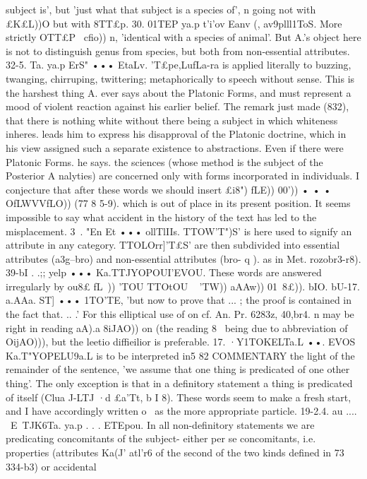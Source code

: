 {{{{{{{{{{{{{{{{{{{{{{{{{{{{{{subject is', but 'just what that subject is a species of', n going
not with £K£L))O but with 8TT£p.
30. 01TEP ya.p t'i'ov Eanv (, av9plll1ToS. More strictly OTT£P ~cfio))
n, 'identical with a species of animal'. But A.'s object here is not
to distinguish genus from species, but both from non-essential
attributes.
32-5. Ta. ya.p ErS" ••• EtaLv. 'T£pe,LufLa-ra is applied literally to
buzzing, twanging, chirruping, twittering; metaphorically to
speech without sense. This is the harshest thing A. ever says
about the Platonic Forms, and must represent a mood of violent
reaction against his earlier belief. The remark just made (832),
that there is nothing white without there being a subject in
which whiteness inheres. leads him to express his disapproval
of the Platonic doctrine, which in his view assigned such a
separate existence to abstractions. Even if there were Platonic
Forms. he says. the sciences (whose method is the subject of the
Posterior A nalyties) are concerned only with forms incorporated
in individuals.
I conjecture that after these words we should insert £i8") fLE))
00')) • • • OfLWVVfLO)) (77 8 5-9). which is out of place in its present
position. It seems impossible to say what accident in the history
of the text has led to the misplacement.
3~. "En Et ••• ollTlIIs. TTOW'T")S' is here used to signify an
attribute in any category. TTOLOrr]'T£S' are then subdivided into
essential attributes (a3g--bro) and non-essential attributes (bro- q ).
as in Met. rozobr3-r8).
39-bI . .;; yelp ••• Ka.TTJYOPOUI'EVOU. These words are answered
irregularly by ou8£ fL~)) 'TOU TTOtOU ~ 'TW)) aAAw)) 01~8£)). bIO.
bU-17. a.AAa. ST] ••• 1TO'TE, 'but now to prove that ... ; the
proof is contained in the fact that. .. .' For this elliptical use
of on cf. An. Pr. 6283z, 40,br4. n may be right in reading aA).a
8iJAO)) on (the reading 8~ being due to abbreviation of OijAO))), but
the leetio diffieilior is preferable.
17. ·Y1TOKELTa.L ••. EVOS Ka.T"YOPELU9a.L is to be interpreted in5 82
COMMENTARY
the light of the remainder of the sentence, 'we assume that one
thing is predicated of one other thing'. The only exception is
that in a definitory statement a thing is predicated of itself (Clua
J-LTJ ·d £a'Tt,
b I
8).
These words seem to make a fresh start, and I have accordingly
written o~ as the more appropriate particle.
19-2.4. au .... ~E~TJK6Ta. ya.p . . . ETEpou. In all non-definitory
statements we are predicating concomitants of the subject-
either per se concomitants, i.e. properties (attributes Ka(J' atl'r6 of
the second of the two kinds defined in 73 334-b3) or accidental
}}}}}}}}}}}}}}}}}}}}}}}}}}}}}}
